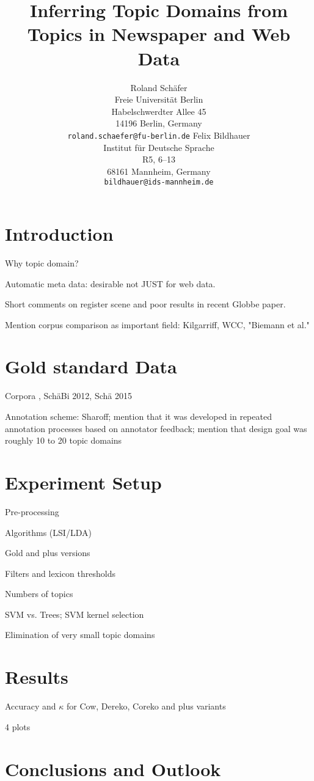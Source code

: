 \documentclass[11pt]{article}
\title{Inferring Topic Domains from Topics in Newspaper and Web Data}
\author{Roland Schäfer\\
	    Freie Universität Berlin\\
	    Habelschwerdter Allee 45\\
	    14196 Berlin, Germany\\
	    {\tt roland.schaefer@fu-berlin.de}
	  \And
	Felix Bildhauer\\
  	Institut für Deutsche Sprache\\
  	R5, 6--13\\
  	68161 Mannheim, Germany\\
  {\tt bildhauer@ids-mannheim.de}}
\date{}
\begin{document}
\maketitle

\begin{abstract}
\end{abstract}

\section{Introduction}

Why topic domain?

Automatic meta data: desirable not JUST for web data.

Short comments on register scene and poor results in recent Globbe paper.

Mention corpus comparison as important field: Kilgarriff, WCC, "Biemann et al."

\section{Gold standard Data}

Corpora \cite{KupietzEa2010}, SchäBi 2012, Schä 2015

Annotation scheme: Sharoff; mention that it was developed in repeated annotation processes based on annotator feedback; mention that design goal was roughly 10 to 20 topic domains

\section{Experiment Setup}

Pre-processing

Algorithms (LSI/LDA)

Gold and plus versions

Filters and lexicon thresholds

Numbers of topics

SVM vs. Trees; SVM kernel selection

Elimination of very small topic domains

\section{Results}

Accuracy and $\kappa$ for Cow, Dereko, Coreko and plus variants

4 plots

\section{Conclusions and Outlook}
\end{document}
